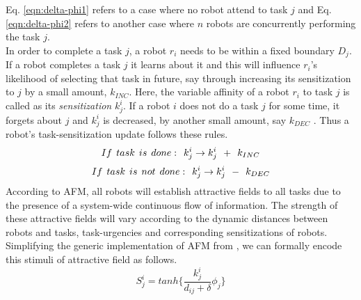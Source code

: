 Eq. \ref{eqn:delta-phi1} refers to a case where no robot attend to task $j$ and Eq. \ref{eqn:delta-phi2} refers to another case where $n$ robots are concurrently performing the task $j$.\\
In order to complete a task $j$, a robot $r_i$ needs to be within a fixed boundary $D_{j}$. If a robot completes a task $j$ it learns about it and this will influence $r_i$'s likelihood of selecting that task in future, say through increasing  its sensitization to $j$ by a small amount, $k_{INC}$. Here, the variable affinity of a robot $r_i$ to task $j$ is called as its {\em sensitization} $k^{i}_{j}$. If a robot $i$ does not do a task $j$ for some time, it forgets about $j$ and $k^i_j$ is decreased, by another small amount, say $k_{DEC}$ .
Thus a robot's task-sensitization update follows these rules.
\begin{equation}
 If\hspace*{0.15cm}task\hspace*{0.15cm}is\hspace*{0.15cm}done:\hspace*{0.15cm}  k^i_j \rightarrow   k^i_j \hspace*{0.15cm} + \hspace*{0.15cm} k_{INC}
\label{eqn:k-inc}
\end{equation}
\begin{equation}
 If\hspace*{0.15cm}task\hspace*{0.15cm}is\hspace*{0.15cm}not\hspace*{0.15cm}done:\hspace*{0.15cm}  k^i_j \rightarrow   k^i_j \hspace*{0.15cm} - \hspace*{0.15cm} k_{DEC}
\label{eqn:k-dec}
\end{equation}
According to AFM, all robots will establish attractive fields to all tasks due to the presence of a system-wide continuous flow of information. The strength of these attractive fields will vary according to the dynamic distances between robots and tasks, task-urgencies and corresponding sensitizations of robots. Simplifying the generic implementation of AFM from , we can formally encode this stimuli of attractive field as follows.
\begin{equation}
S_{j}^{i} = tanh\{\frac{k_{j}^{i}}{d_{ij}+\delta } \phi _{j}\}
\label{eqn:afm1}
\end{equation}
